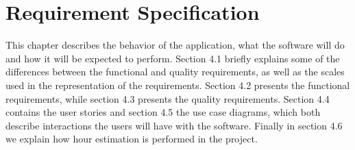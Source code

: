 \chapter{Requirement Specification}

	This chapter describes the behavior of the application, what the software will do 
	and how it will be expected to perform. Section 4.1 briefly explains some of the differences between the functional and quality requirements, as well as the scales used in the representation of the requirements. Section 4.2 presents the functional requirements, while section 4.3 presents the quality requirements. Section 4.4 contains the user stories and section 4.5 the use case diagrams, which both describe interactions the users will have with the software. Finally in section 4.6 we explain how hour estimation is performed in the project.
